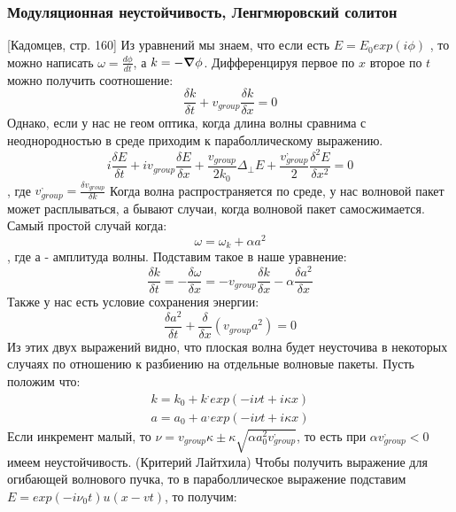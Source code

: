 \documentclass[10pt, a4paper]{article}
\begin{document}
\subsubsection{Модуляционная неустойчивость, Ленгмюровский солитон}
[Кадомцев, стр. 160]
Из уравнений мы знаем, что если есть $E=E_0 exp (i \phi)$ , то можно написать $\omega=\frac{d \phi}{dt}$, а $k=- \grad \phi$. Дифференцируя первое по $x$ второе по $t$ можно получить соотношение:
\begin{equation}
	\frac{\delta k}{\delta t} + v_{group} \frac{\delta k}{\delta x}=0
\end{equation}
Однако, если у нас не геом оптика, когда длина волны сравнима с неоднородностью в среде приходим к параболлическому выражению.
\begin{equation}
	i  \frac{\delta E}{\delta t} + i v_{group} \frac{\delta E}{\delta x} + \frac{v_{group}}{2 k_0} \Delta_{\perp} E + \frac{v^{,}_{group}}{2}  \frac{\delta^2 E}{\delta x^2}=0
\end{equation}
, где $v^{,}_{group}=\frac{\delta v_{group}}{\delta k}$ 
Когда волна распространяется по среде, у нас волновой пакет может расплываться, а бывают случаи, когда волновой пакет самосжимается.
Самый простой случай когда:
\begin{equation}
	\omega=\omega_k + \alpha a^2
\end{equation}
, где а - амплитуда волны. Подставим такое в наше уравнение:
\begin{equation}
	\frac{\delta k}{\delta t} = - \frac{\delta \omega}{\delta x}=-v_{group} \frac{\delta k}{\delta x} - \alpha \frac{\delta a^{2}}{\delta x}
\end{equation}
Также у нас есть условие сохранения энергии:
\begin{equation}
	\frac{\delta a^{2}}{\delta t} + \frac{\delta }{\delta x} (v_{group} a^2)=0 
\end{equation}
Из этих двух выражений видно, что плоская волна будет неусточива в некоторых случаях по отношению к разбиению на отдельные волновые пакеты. Пусть положим что:
\begin{align*}
	k=k_0 + k^{,} exp(-i \nu t + i \kappa x) \\
	a=a_0 + a^{,} exp(-i \nu t + i \kappa x) 
\end{align*}
Если инкремент малый, то $\nu=v_{group} \kappa \pm \kappa \sqrt{\alpha a^2_0 v^{,}_{group}}$, то есть при $\alpha v^{,}_{group} < 0$ имеем неустойчивость. (Критерий Лайтхила)
Чтобы получить выражение для огибающей волнового пучка, то в параболлическое выражение подставим $E=exp(-i \nu_0 t) u(x-vt)$, то получим:
\end{document}
